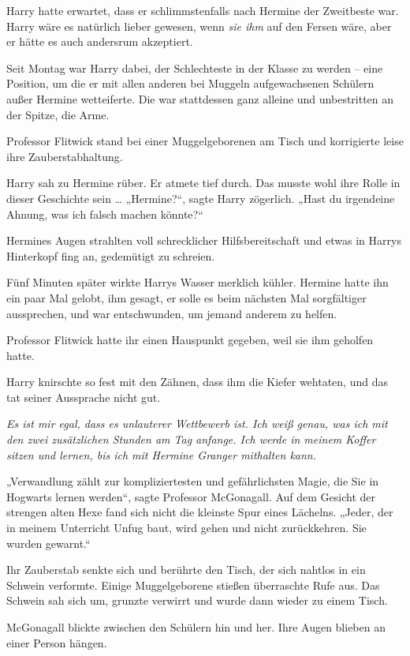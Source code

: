 {Harry hatte erwartet, dass er schlimmstenfalls nach Hermine der Zweitbeste war. Harry wäre es natürlich lieber gewesen, wenn \emph{sie ihm} auf den Fersen wäre, aber er hätte es auch andersrum akzeptiert.

Seit Montag war Harry dabei, der Schlechteste in der Klasse zu werden -- eine Position, um die er mit allen anderen bei Muggeln aufgewachsenen Schülern außer Hermine wetteiferte. Die war stattdessen ganz alleine und unbestritten an der Spitze, die Arme.

Professor Flitwick stand bei einer Muggelgeborenen am Tisch und korrigierte leise ihre Zauberstabhaltung.

Harry sah zu Hermine rüber. Er atmete tief durch. Das musste wohl ihre Rolle in dieser Geschichte sein … „Hermine?“, sagte Harry zögerlich. „Hast du irgendeine Ahnung, was ich falsch machen könnte?“

Hermines Augen strahlten voll schrecklicher Hilfsbereitschaft und etwas in Harrys Hinterkopf fing an, gedemütigt zu schreien.

Fünf Minuten später wirkte Harrys Wasser merklich kühler. Hermine hatte ihn ein paar Mal gelobt, ihm gesagt, er solle es beim nächsten Mal sorgfältiger aussprechen, und war entschwunden, um jemand anderem zu helfen.

Professor Flitwick hatte ihr einen Hauspunkt gegeben, weil sie ihm geholfen hatte.

Harry knirschte so fest mit den Zähnen, dass ihm die Kiefer wehtaten, und das tat seiner Aussprache nicht gut.

\emph{Es ist mir egal, dass es unlauterer Wettbewerb ist. Ich weiß genau, was ich mit den zwei zusätzlichen Stunden am Tag anfange. Ich werde in meinem Koffer sitzen und lernen, bis ich mit Hermine Granger mithalten kann.}

\later

„Verwandlung zählt zur kompliziertesten und gefährlichsten Magie, die Sie in Hogwarts lernen werden“, sagte Professor McGonagall. Auf dem Gesicht der strengen alten Hexe fand sich nicht die kleinste Spur eines Lächelns. „Jeder, der in meinem Unterricht Unfug baut, wird gehen und nicht zurückkehren. Sie wurden gewarnt.“

Ihr Zauberstab senkte sich und berührte den Tisch, der sich nahtlos in ein Schwein verformte. Einige Muggelgeborene stießen überraschte Rufe aus. Das Schwein sah sich um, grunzte verwirrt und wurde dann wieder zu einem Tisch.

McGonagall blickte zwischen den Schülern hin und her. Ihre Augen blieben an einer Person hängen.

}
